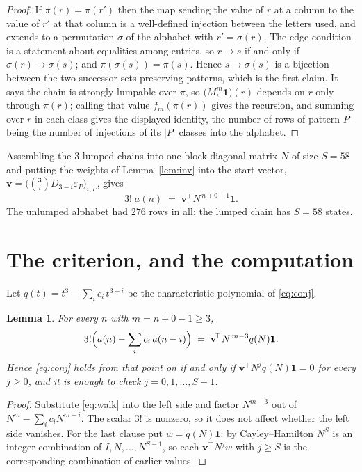 \documentclass[11pt,a4paper]{article}
\theoremstyle{plain}
\newtheorem{lemma}[theorem]{Lemma}
\theoremstyle{definition}
\begin{document}
\begin{proof}
If $\pi(r)=\pi(r')$ then the map sending the value of $r$ at a column to the value of $r'$
at that column is a well-defined injection between the letters used, and extends to a
permutation $\sigma$ of the alphabet with $r'=\sigma(r)$. The edge condition is a statement
about equalities among entries, so $r\to s$ if and only if $\sigma(r)\to\sigma(s)$; and
$\pi(\sigma(s))=\pi(s)$. Hence $s\mapsto\sigma(s)$ is a bijection between the two successor
sets preserving patterns, which is the first claim. It says the chain is strongly lumpable
over $\pi$, so $\bigl(M_i^{m}\mathbf{1}\bigr)(r)$ depends on $r$ only through $\pi(r)$;
calling that value $f_m(\pi(r))$ gives the recursion, and summing over $r$ in each class
gives the displayed identity, the number of rows of pattern $P$ being the number of
injections of its $|P|$ classes into the alphabet.
\end{proof}

Assembling the $3$ lumped chains into one block-diagonal matrix $N$ of size $S=58$ and
putting the weights of Lemma~\ref{lem:inv} into the start vector,
$\mathbf{v}=\bigl(\binom{3}{i}D_{3-i}\varepsilon_P\bigr)_{i,P}$, gives
\begin{equation}\label{eq:walk}
3!\;a(n)\;=\;\mathbf{v}^{\!\top}N^{\,n+0-1}\mathbf{1} .
\end{equation}
The unlumped alphabet had $276$ rows in all; the lumped chain has $S=58$ states.

\section{The criterion, and the computation}

Let $q(t)=t^{3}-\sum_i c_i\,t^{3-i}$ be the characteristic polynomial of
\eqref{eq:conj}.

\begin{lemma}\label{lem:crit}
For every $n$ with $m=n+0-1\ge3$,
\[
3!\Bigl(a(n)-\sum_i c_i\,a(n-i)\Bigr)\;=\;\mathbf{v}^{\!\top}N^{\,m-3}q(N)\mathbf{1} .
\]
Hence \eqref{eq:conj} holds from that point on if and only if
$\mathbf{v}^{\!\top}N^{j}q(N)\mathbf{1}=0$ for every $j\ge0$, and it is enough to check
$j=0,1,\dots,S-1$.
\end{lemma}

\begin{proof}
Substitute \eqref{eq:walk} into the left side and factor $N^{m-3}$ out of
$N^{m}-\sum_i c_iN^{m-i}$. The scalar $3!$ is nonzero, so it does not affect whether
the left side vanishes. For the last clause put $w=q(N)\mathbf{1}$: by Cayley--Hamilton
$N^{S}$ is an integer combination of $I,N,\dots,N^{S-1}$, so each
$\mathbf{v}^{\!\top}N^{j}w$ with $j\ge S$ is the corresponding combination of earlier
values.
\end{proof}
\end{document}
